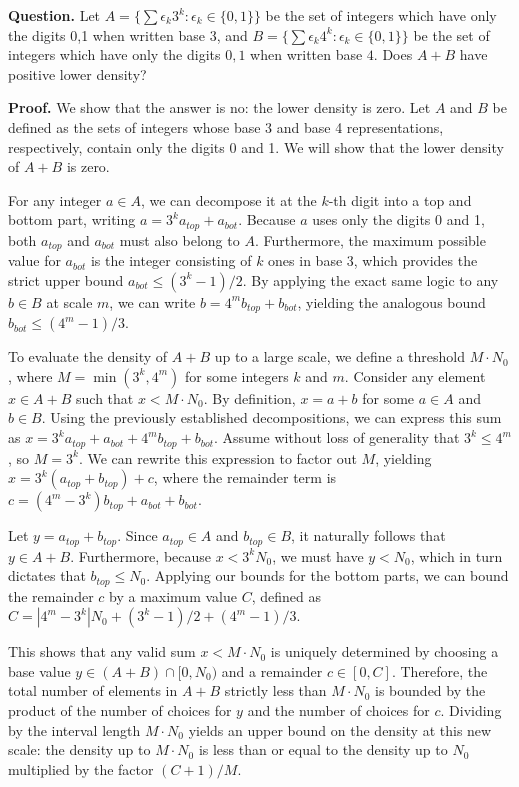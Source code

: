 \noindent \textbf{Question.} Let $A=\{\sum\epsilon_k 3^k:\epsilon_k\in\{0,1\}\}$
 be the set of integers which have only the digits 0,1
 when written base 3, and $B=\{\sum\epsilon_k 4^k:\epsilon_k\in\{0,1\}\}$
 be the set of integers which have only the digits $0,1$
 when written base $4$.
Does $A+B$
 have positive lower density?
 
\noindent \textbf{Proof.} We show that the answer is no: the lower density is zero. Let $A$ and $B$ be defined as the sets of integers whose base 3 and base 4 representations, respectively, contain only the digits 0 and 1. We will show that the lower density of $A + B$ is zero.  
        
        For any integer $a \in A$, we can decompose it at the $k$-th digit into a top and bottom part, writing $a = 3^k a_{top} + a_{bot}$. Because $a$ uses only the digits 0 and 1, both $a_{top}$ and $a_{bot}$ must also belong to $A$. Furthermore, the maximum possible value for $a_{bot}$ is the integer consisting of $k$ ones in base 3, which provides the strict upper bound $a_{bot} \leq (3^k - 1)/2$. By applying the exact same logic to any $b \in B$ at scale $m$, we can write $b = 4^m b_{top} + b_{bot}$, yielding the analogous bound $b_{bot} \leq (4^m - 1)/3$.
        
        To evaluate the density of $A + B$ up to a large scale, we define a threshold $M \cdot N_0$, where $M = \min(3^k, 4^m)$ for some integers $k$ and $m$. Consider any element $x \in A + B$ such that $x < M \cdot N_0$. By definition, $x = a + b$ for some $a \in A$ and $b \in B$. Using the previously established decompositions, we can express this sum as $x = 3^k a_{top} + a_{bot} + 4^m b_{top} + b_{bot}$. Assume without loss of generality that $3^k \leq 4^m$, so $M = 3^k$. We can rewrite this expression to factor out $M$, yielding $x = 3^k(a_{top} + b_{top}) + c$, where the remainder term is $c = (4^m - 3^k)b_{top} + a_{bot} + b_{bot}$.
        
        Let $y = a_{top} + b_{top}$. Since $a_{top} \in A$ and $b_{top} \in B$, it naturally follows that $y \in A + B$. Furthermore, because $x < 3^k N_0$, we must have $y < N_0$, which in turn dictates that $b_{top} \leq N_0$. Applying our bounds for the bottom parts, we can bound the remainder $c$ by a maximum value $C$, defined as $C = |4^m - 3^k|N_0 + (3^k - 1)/2 + (4^m - 1)/3$.
        
        This shows that any valid sum $x < M \cdot N_0$ is uniquely determined by choosing a base value $y \in (A+B) \cap [0, N_0)$ and a remainder $c \in [0, C]$. Therefore, the total number of elements in $A+B$ strictly less than $M \cdot N_0$ is bounded by the product of the number of choices for $y$ and the number of choices for $c$. Dividing by the interval length $M \cdot N_0$ yields an upper bound on the density at this new scale: the density up to $M \cdot N_0$ is less than or equal to the density up to $N_0$ multiplied by the factor $(C + 1)/M$.
        
